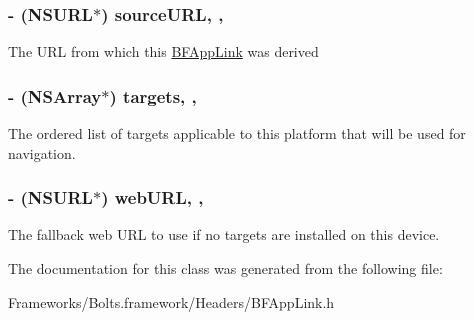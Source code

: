 \subsubsection[{source\+U\+R\+L}]{\setlength{\rightskip}{0pt plus 5cm}-\/ (N\+S\+U\+R\+L$\ast$) source\+U\+R\+L\hspace{0.3cm}{\ttfamily [read]}, {\ttfamily [nonatomic]}, {\ttfamily [strong]}}\label{interface_b_f_app_link_a4db7f973d6e7e0eab7357b3e1088a84b}
The U\+R\+L from which this \hyperlink{interface_b_f_app_link}{B\+F\+App\+Link} was derived \hypertarget{interface_b_f_app_link_a6030f56ee163277ec6bbc6c1d1622dcf}{}
\subsubsection[{targets}]{\setlength{\rightskip}{0pt plus 5cm}-\/ (N\+S\+Array$\ast$) targets\hspace{0.3cm}{\ttfamily [read]}, {\ttfamily [nonatomic]}, {\ttfamily [copy]}}\label{interface_b_f_app_link_a6030f56ee163277ec6bbc6c1d1622dcf}
The ordered list of targets applicable to this platform that will be used for navigation. \hypertarget{interface_b_f_app_link_a427314607aa703c9e4213385e20b5d48}{}
\subsubsection[{web\+U\+R\+L}]{\setlength{\rightskip}{0pt plus 5cm}-\/ (N\+S\+U\+R\+L$\ast$) web\+U\+R\+L\hspace{0.3cm}{\ttfamily [read]}, {\ttfamily [nonatomic]}, {\ttfamily [strong]}}\label{interface_b_f_app_link_a427314607aa703c9e4213385e20b5d48}
The fallback web U\+R\+L to use if no targets are installed on this device. 

The documentation for this class was generated from the following file\+:\begin{DoxyCompactItemize}
\item 
Frameworks/\+Bolts.\+framework/\+Headers/B\+F\+App\+Link.\+h\end{DoxyCompactItemize}
